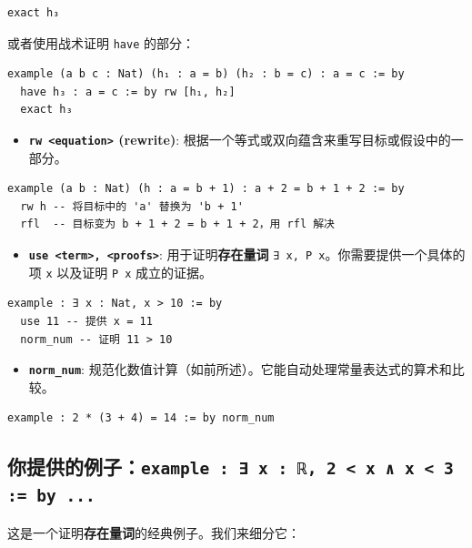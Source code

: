 \documentclass{amsart}
\theoremstyle{plain}
\theoremstyle{definition}
\theoremstyle{remark}
\begin{document}
\begin{enumerate}
\begin{lstlisting}[language=lean]
  exact h₃
\end{lstlisting}或者使用战术证明 \lstinline{have} 的部分：
\begin{lstlisting}[language=lean]
example (a b c : Nat) (h₁ : a = b) (h₂ : b = c) : a = c := by
  have h₃ : a = c := by rw [h₁, h₂]
  exact h₃
\end{lstlisting}	\begin{itemize}
		\item \textbf{\lstinline{rw <equation>} (rewrite)}: 根据一个等式或双向蕴含来重写目标或假设中的一部分。
	\end{itemize}
\begin{lstlisting}[language=lean]
example (a b : Nat) (h : a = b + 1) : a + 2 = b + 1 + 2 := by
  rw h -- 将目标中的 'a' 替换为 'b + 1'
  rfl  -- 目标变为 b + 1 + 2 = b + 1 + 2，用 rfl 解决
\end{lstlisting}	\begin{itemize}
		\item \textbf{\lstinline{use <term>, <proofs>}}: 用于证明\textbf{存在量词} \lstinline{∃ x, P x}。你需要提供一个具体的项 \lstinline{x} 以及证明 \lstinline{P x} 成立的证据。
	\end{itemize}
\begin{lstlisting}[language=lean]
example : ∃ x : Nat, x > 10 := by
  use 11 -- 提供 x = 11
  norm_num -- 证明 11 > 10
\end{lstlisting}	\begin{itemize}
		\item \textbf{\lstinline{norm_num}}: 规范化数值计算（如前所述）。它能自动处理常量表达式的算术和比较。
	\end{itemize}
\begin{lstlisting}[language=lean]
example : 2 * (3 + 4) = 14 := by norm_num
\end{lstlisting}\end{enumerate}

\subsection{你提供的例子：\lstinline{example : ∃ x : ℝ, 2 < x ∧ x < 3 := by ...}}

这是一个证明\textbf{存在量词}的经典例子。我们来细分它：
\end{document}
